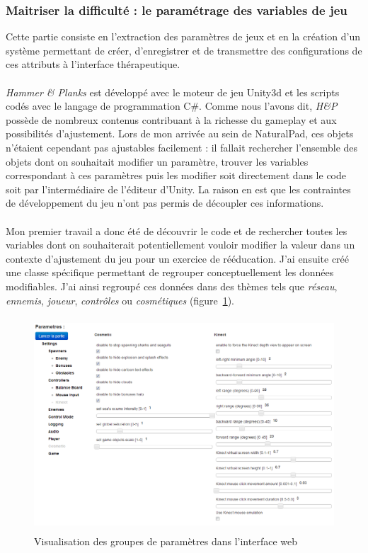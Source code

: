 	\subsubsection*{Maitriser la difficulté : le paramétrage des variables de jeu}
Cette partie consiste en l'extraction des paramètres de jeux et en la création d'un système permettant de créer, d'enregistrer et de transmettre des configurations de ces attributs à l'interface thérapeutique.

\paragraph{}
\emph{Hammer \& Planks} est développé avec le moteur de jeu Unity3d et les scripts codés avec le langage de programmation C\#. Comme nous l'avons dit, \emph{H\&P} possède de nombreux contenus contribuant à la richesse du gameplay et aux possibilités d'ajustement. Lors de mon arrivée au sein de NaturalPad, ces objets n'étaient cependant pas ajustables facilement : il fallait rechercher l'ensemble des objets dont on souhaitait modifier un paramètre, trouver les variables correspondant à ces paramètres puis les modifier soit directement dans le code soit par l'intermédiaire de l'éditeur d'Unity. La raison en est que les contraintes de développement du jeu n'ont pas permis de découpler ces informations.

\paragraph{}
Mon premier travail a donc été de découvrir le code et de rechercher toutes les variables dont on souhaiterait potentiellement vouloir modifier la valeur dans un contexte d'ajustement du jeu pour un exercice de rééducation. J'ai ensuite créé une classe spécifique permettant de regrouper conceptuellement les données modifiables. J'ai ainsi regroupé ces données dans des thèmes tels que \emph{réseau}, \emph{ennemis}, \emph{joueur}, \emph{contrôles} ou \emph{cosmétiques} (figure~\ref{ensemble_parametres}).
\begin{figure}[!hbtp]
	\centering
	\includegraphics[width=14cm, height=8cm]{images/ensemble_parametres.png}
	\caption{Visualisation des groupes de paramètres dans l'interface web}
	\label{ensemble_parametres}
\end{figure}

